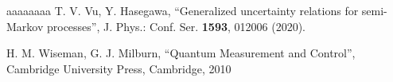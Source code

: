 \documentclass[a4paper,11pt]{article}
\numberwithin{equation}{section}
\begin{document}
\begin{thebibliography}{aaaaaaaa}
 T. V. Vu, Y. Hasegawa, ``Generalized uncertainty relations for semi-Markov processes'', J. Phys.: Conf. Ser. {\bf 1593}, 012006 (2020).

 H. M. Wiseman, G. J. Milburn, ``Quantum Measurement and Control'', Cambridge University Press, Cambridge, 2010


















\end{thebibliography}
\end{document}
